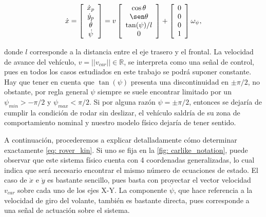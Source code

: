 \begin{equation} \label{eq: rover_kin}
    \dot x =
    \left [
      \begin{array}{c}
         \dot x_p \\
         \dot y_p \\
         \dot \theta \\
         \dot \psi
      \end{array}
    \right ] =
    v
    \left [
      \begin{array}{c}
         \cos \theta\\
         \sen \theta\\
         \tan (\psi)/l\\
         0
      \end{array}
    \right ]
    +
    \left [
      \begin{array}{c}
         0\\
         0\\
         0\\
         1
      \end{array}
    \right ]
    \omega_{\psi}
    ,
\end{equation}

donde $l$ corresponde a la distancia entre el eje trasero y el frontal. La velocidad de avance del vehículo, $v = ||v_{car}|| \in \mathds{R}$, se interpreta como una señal de control, pues en todos los casos estudiados en este trabajo se podrá suponer constante. Hay que tener en cuenta que $\tan(\psi)$ presenta una discontinuidad en $\pm \pi/2$, no obstante, por regla general $\psi$ siempre se suele encontrar limitado por un $\psi_{min} > -\pi/2$ y $\psi_{max} < \pi/2$. Si por alguna razón $\psi = \pm \pi/2$, entonces se dejaría de cumplir la condición de rodar sin deslizar, el vehículo saldría de su zona de comportamiento nominal y nuestro modelo físico dejaría de tener sentido.

A continuación, procederemos a explicar detalladamente cómo determinar exactamente \eqref{eq: rover_kin}. Si uno se fija en la \autoref{fig: carlike_notation}, puede observar que este sistema físico cuenta con 4 coordenadas generalizadas, lo cual indica que será necesario encontrar el mismo número de ecuaciones de estado. El caso de $\dot x$ e $\dot y$ es bastante sencillo, pues basta con proyectar el vector velocidad $v_{car}$ sobre cada uno de los ejes X-Y. La componente $\dot \psi$, que hace referencia a la velocidad de giro del volante, también es bastante directa, pues corresponde a una señal de actuación sobre el sistema. 

